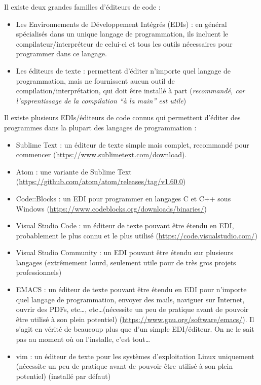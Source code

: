 \documentclass[../../main.tex]{subfiles}
\begin{document}
Il existe deux grandes familles d'éditeurs de code :
\begin{itemize}
	\item Les Environnements de Développement Intégrés (EDIs) : en général spécialisés dans un unique langage de programmation, ils incluent le compilateur/interpréteur de celui-ci et tous les outils nécessaires pour programmer dans ce langage.
	\item Les éditeurs de texte : permettent d'éditer n'importe quel langage de programmation, mais ne fournissent aucun outil de compilation/interprétation, qui doit être installé à part (\textit{recommandé, car l'apprentissage de la compilation ``à la main'' est utile})
\end{itemize}
Il existe plusieurs EDIs/éditeurs de code connus qui permettent d'éditer des programmes dans la plupart des langages de programmation :
\begin{itemize}
	\item Sublime Text : un éditeur de texte simple mais complet, recommandé pour commencer (\url{https://www.sublimetext.com/download}).
	\item Atom : une variante de Sublime Text (\url{https://github.com/atom/atom/releases/tag/v1.60.0})
	\item Code::Blocks : un EDI pour programmer en langages C et C++ sous Windows (\url{https://www.codeblocks.org/downloads/binaries/})
	\item Visual Studio Code : un éditeur de texte pouvant être étendu en EDI, probablement le plus connu et le plus utilisé (\url{https://code.visualstudio.com/})
	\item Visual Studio Community : un EDI pouvant être étendu sur plusieurs langages (extrêmement lourd, seulement utile pour de très gros projets professionnels)
	\item EMACS : un éditeur de texte pouvant être étendu en EDI pour n'importe quel langage de programmation, envoyer des mails, naviguer sur Internet, ouvrir des PDFs, etc\dots, etc\dots (nécessite un peu de pratique avant de pouvoir être utilisé à son plein potentiel) (\url{https://www.gnu.org/software/emacs/}).\newline
		Il s'agit en vérité de beaucoup plus que d'un simple EDI/éditeur. On ne le sait pas au moment où on l'installe, c'est tout\dots
	\item vim : un éditeur de texte pour les systèmes d'exploitation Linux uniquement (nécessite un peu de pratique avant de pouvoir être utilisé à son plein potentiel) (installé par défaut)
\end{itemize}
\end{document}

